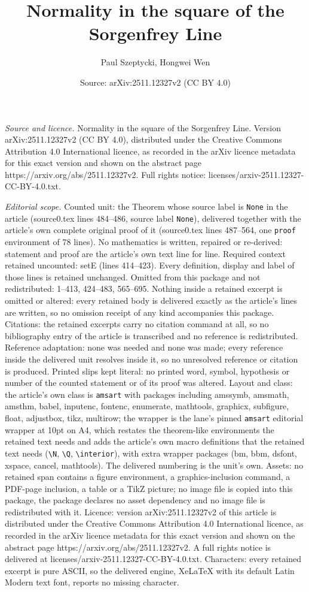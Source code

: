 \documentclass[10pt,a4paper]{amsart}
\title[Normality in the square of the Sorgenfrey Line]{Normality in the square of the Sorgenfrey Line}
\author{Paul Szeptycki, Hongwei Wen}
\date{Source: arXiv:2511.12327v2 (CC BY 4.0)}
\begin{document}
\maketitle

\noindent\emph{Source and licence.} Normality in the square of the Sorgenfrey Line. Version arXiv:2511.12327v2 (CC BY 4.0), distributed under the Creative Commons Attribution 4.0 International licence, as recorded in the arXiv licence metadata for this exact version and shown on the abstract page https://arxiv.org/abs/2511.12327v2. Full rights notice: licenses/arxiv-2511.12327-CC-BY-4.0.txt.\par\smallskip

\noindent\textit{Editorial scope.} Counted unit: the Theorem whose source label is \texttt{None} in the article (source0.tex lines 484--486, source label \texttt{None}), delivered together with the article's own complete original proof of it (source0.tex lines 487--564, one \texttt{proof} environment of 78 lines). No mathematics is written, repaired or re-derived: statement and proof are the article's own text line for line. Required context retained uncounted: setE (lines 414--423). Every definition, display and label of those lines is retained unchanged. Omitted from this package and not redistributed: 1--413, 424--483, 565--695. Nothing inside a retained excerpt is omitted or altered: every retained body is delivered exactly as the article's lines are written, so no omission receipt of any kind accompanies this package. Citations: the retained excerpts carry no citation command at all, so no bibliography entry of the article is transcribed and no reference is redistributed. Reference adaptation: none was needed and none was made; every reference inside the delivered unit resolves inside it, so no unresolved reference or citation is produced. Printed slips kept literal: no printed word, symbol, hypothesis or number of the counted statement or of its proof was altered. Layout and class: the article's own class is \texttt{amsart} with packages including amssymb, amsmath, amsthm, babel, inputenc, fontenc, enumerate, mathtools, graphicx, subfigure, float, adjustbox, tikz, multirow; the wrapper is the lane's pinned \texttt{amsart} editorial wrapper at 10pt on A4, which restates the theorem-like environments the retained text needs and adds the article's own macro definitions that the retained text needs (\texttt{\textbackslash N}, \texttt{\textbackslash Q}, \texttt{\textbackslash interior}), with extra wrapper packages (bm, bbm, dsfont, xspace, cancel, mathtools). The delivered numbering is the unit's own. Assets: no retained span contains a figure environment, a graphics-inclusion command, a PDF-page inclusion, a table or a TikZ picture; no image file is copied into this package, the package declares no asset dependency and no image file is redistributed with it. Licence: version arXiv:2511.12327v2 of this article is distributed under the Creative Commons Attribution 4.0 International licence, as recorded in the arXiv licence metadata for this exact version and shown on the abstract page https://arxiv.org/abs/2511.12327v2. A full rights notice is delivered at licenses/arxiv-2511.12327-CC-BY-4.0.txt. Characters: every retained excerpt is pure ASCII, so the delivered engine, XeLaTeX with its default Latin Modern text font, reports no missing character.
\end{document}
